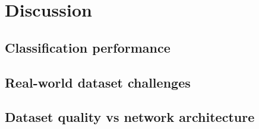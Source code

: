 \chapter{Discussion}
\label{chap:discussion}

\section{Classification performance}


\section{Real-world dataset challenges}
\label{sec:real-world-dataset-challanges}





\section{Dataset quality vs network architecture}


